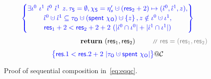 \begin{figure}
\[{{\begin{array}{c}
{\!\!\!}
\\\\[-5pt]
\spec{\!\!\!
\begin{array}{c}
  \exists \ikn^0~\ikn^1~\iknh^0~\iknh^1~z \ldot     
  \tkns = \emptyset, \hists = \gists' \hunion (\res_2+2) \mapsto (\iknh^0, \iknh^1, z),\\[2pt]
  \iknh^0 \hunion \iknh^1 \subseteq \tkno \hunion (\Tomb~\histo) \hunion \set{z}\aand z \notin \ikn^0 \hunion \ikn^1,\\[2pt] 
  \res_1 + 2 < \res_2 + 2 + 2 \ (|\iknh^0 \cap \ikn^0| + |\iknh^1 \cap \ikn^1|)
\end{array}
\!\!\!}
\\\\[-5pt]  
~~~~~~~~~~~~~~~~~~~~~~~~~~~~~~~~
\kw{return}~(\res_1, \res_2) ~\comm{\res = (\res_1, \res_2)}
\\\\[-5pt]
\spec{\!\!\!
\begin{array}{c}
  \res.1 < \res.2 + 2 \ |\tkno \hunion \Tomb~\histo| 
  \end{array}
  \!\!\!}@\ccon
\end{array}
}} 
\]
%
%
\caption{Proof of sequential composition in~\eqref{eq:eqqc}.}
\label{fig:proof2}
\end{figure}

